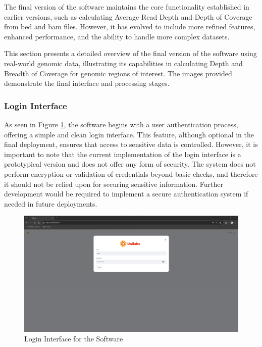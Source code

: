 The final version of the software maintains the core functionality established in earlier versions, such as calculating Average Read Depth and Depth of Coverage from \ac{bed} and \ac{bam} files. However, it has evolved to include more refined features, enhanced performance, and the ability to handle more complex datasets.

This section presents a detailed overview of the final version of the software using real-world genomic data, illustrating its capabilities in calculating Depth and Breadth of Coverage for genomic regions of interest. The images provided demonstrate the final interface and processing stages.

\subsubsection{\textbf{Login Interface}}

As seen in Figure \ref{fig:login}, the software begins with a user authentication process, offering a simple and clean login interface. This feature, although optional in the final deployment, ensures that access to sensitive data is controlled. However, it is important to note that the current implementation of the login interface is a prototypical version and does not offer any form of security. The system does not perform encryption or validation of credentials beyond basic checks, and therefore it should not be relied upon for securing sensitive information. Further development would be required to implement a secure authentication system if needed in future deployments.

\begin{figure}[H]
    \centering
    \includegraphics[width=\textwidth]{figs/v3.1.png}
    \caption{Login Interface for the Software}
    \label{fig:login}
\end{figure}

